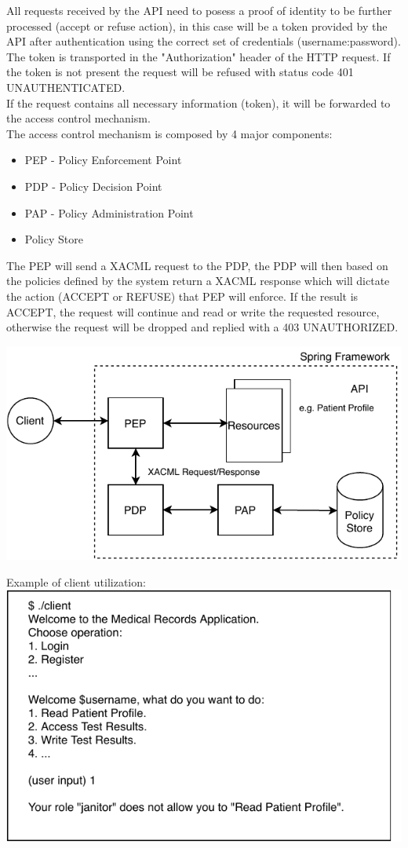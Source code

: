 All requests received by the API need to posess a proof of identity to be further processed (accept or refuse action), in this case will be a token provided by the API after authentication using the correct set of credentials (username:password). The token is transported in the "Authorization" header of the HTTP request. If the token is not present the request will be refused with status code 401 UNAUTHENTICATED. \\

If the request contains all necessary information (token), it will be forwarded to the access control mechanism. \\

The access control mechanism is composed by 4 major components:
\begin{itemize}
	\item PEP - Policy Enforcement Point
	\item PDP - Policy Decision Point
	\item PAP - Policy Administration Point
	\item Policy Store
\end{itemize}

The PEP will send a XACML request to the PDP, the PDP will then based on the policies defined by the system return a XACML response which will dictate the action (ACCEPT or REFUSE) that PEP will enforce. If the result is ACCEPT, the request will continue and read or write the requested resource, otherwise the request will be dropped and replied with a 403 UNAUTHORIZED.

	\includegraphics[width=.6\textwidth]{figs/access_control.pdf}
	
	
Example of client utilization: \\
\includegraphics[width=.6\textwidth]{figs/client_utilization.pdf}


